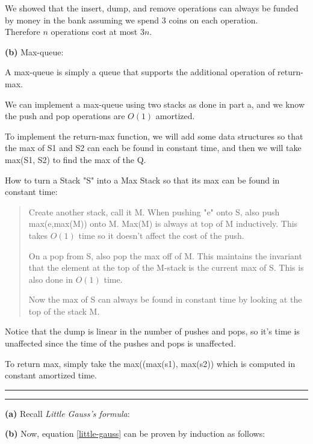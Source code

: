 \documentclass[11pt]{article}
\newcommand{\question}[2] {\vspace{.25in} \hrule\vspace{0.5em}
\noindent{\bf #1: #2} \vspace{0.5em}
\hrule \vspace{.10in}}
\renewcommand{\part}[1] {\vspace{.10in} {\bf (#1)}}
\begin{document}
We showed that the insert, dump, and remove operations can always be funded by money in the bank assuming we spend 3 coins on each operation.\\
Therefore $n$ operations cost at most $3n$.

\part{b} Max-queue:

A max-queue is simply a queue that supports the additional operation of return-max.

We can implement a max-queue using two stacks as done in part a, and we know the push and pop operations are $O(1)$ amortized.

To implement the return-max function, we will add some data structures so that the max of S1 and S2 can each be found in constant time, and then we will take max(S1, S2) to find the max of the Q.

How to turn a Stack "S" into a Max Stack so that its max can be found in constant time:

\begin{quote}
Create another stack, call it M.
When pushing "e" onto S, also push max(e,max(M)) onto M. Max(M) is always at top of M inductively.
This takes $O(1)$ time so it doesn't affect the cost of the push.

On a pop from S, also pop the max off of M.
This maintains the invariant that the element at the top of the M-stack is the current max of S.
This is also done in $O(1)$ time.

Now the max of S can always be found in constant time by looking at the top of the stack M.
\end{quote}

Notice that the dump is linear in the number of pushes and pops, so it's time is unaffected since the time of the pushes and pops is unaffected.

To return max, simply take the max((max(s1), max(s2)) which is computed in constant amortized time.


\question{2}{Little Gauss's Formula}

\part{a} Recall {\em Little Gauss's formula}:

\part{b} Now, equation \ref{little-gauss} can be proven by induction as
follows:
\end{document}
